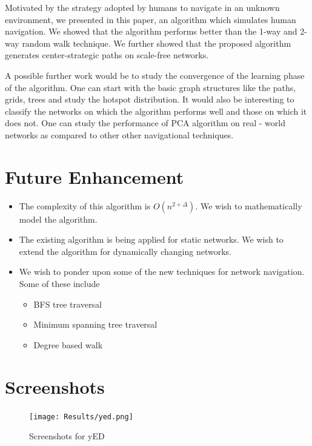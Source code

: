 \documentclass[a4paper,12pt]{article}
\begin{document}
Motivated by the strategy adopted by humans to navigate in an unknown environment, we presented
in this paper, an algorithm which simulates human navigation. We showed that the algorithm
performs better than the 1-way and 2-way random walk technique. We further showed that 
the proposed algorithm generates center-strategic paths on scale-free networks. 

A possible further work would be to study the convergence of the learning phase of 
the algorithm. One can start with the basic graph structures like the paths, grids, trees 
and study the hotspot distribution. It would also be interesting to classify the networks
on which the algorithm performs well and those on which it does not. One can study the 
performance of PCA algorithm on real - world networks as compared to other other 
navigational techniques. 

\section{Future Enhancement}  
\begin{itemize}
 \item The complexity of this algorithm is $O(n^{2 + \Delta})$. We wish to mathematically model the algorithm.  
 \item The existing algorithm is being applied for static networks. We wish to extend the algorithm for dynamically changing networks.
 \item We wish to ponder upon some of the new techniques for network navigation. Some of these include 
  \begin{itemize}
    \item BFS tree traversal
    \item Minimum spanning tree traversal
    \item Degree based walk
  \end{itemize}
\end{itemize}

\newpage
\section{Screenshots}

\begin{figure}[htp]
\begin{center}
\texttt{[image: Results/yed.png]}
\caption{Screenshots for yED}
\end{center}
\end{figure}
\end{document}
